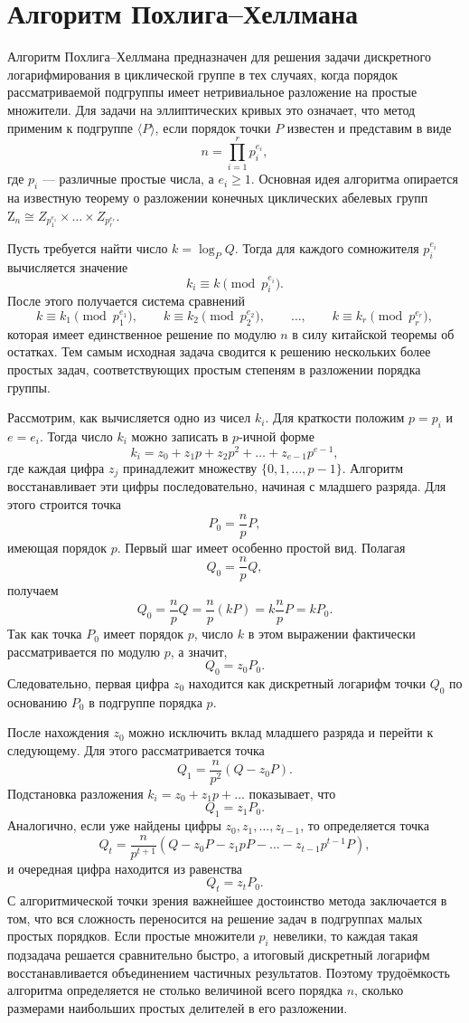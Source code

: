 \section{Алгоритм Похлига--Хеллмана}

Алгоритм Похлига--Хеллмана предназначен для решения задачи дискретного логарифмирования в циклической группе в тех случаях, когда порядок рассматриваемой подгруппы имеет нетривиальное разложение на простые множители. Для задачи на эллиптических кривых это означает, что метод применим к подгруппе $\langle P\rangle$, если порядок точки $P$ известен и представим в виде
\[
n=\prod_{i=1}^{r} p_i^{e_i},
\]
где $p_i$ --- различные простые числа, а $e_i\ge 1$. Основная идея алгоритма опирается на известную теорему о разложении конечных циклических абелевых групп $\mathrm Z_n \cong Z_{p_1^{e_1}} \times \dots \times Z_{p_r^{e_r}}$.

Пусть требуется найти число $k=\log_P Q$. Тогда для каждого сомножителя $p_i^{e_i}$ вычисляется значение
\[
k_i \equiv k \pmod {p_i^{e_i}}.
\]
После этого получается система сравнений
\[
k \equiv k_1 \pmod {p_1^{e_1}}, \qquad
k \equiv k_2 \pmod {p_2^{e_2}}, \qquad \dots, \qquad
k \equiv k_r \pmod {p_r^{e_r}},
\]
которая имеет единственное решение по модулю $n$ в силу китайской теоремы об остатках. Тем самым исходная задача сводится к решению нескольких более простых задач, соответствующих простым степеням в разложении порядка группы.

Рассмотрим, как вычисляется одно из чисел $k_i$. Для краткости положим $p=p_i$ и $e=e_i$. Тогда число $k_i$ можно записать в $p$-ичной форме
\[
k_i=z_0+z_1p+z_2p^2+\dots+z_{e-1}p^{e-1},
\]
где каждая цифра $z_j$ принадлежит множеству $\{0,1,\dots,p-1\}$. Алгоритм восстанавливает эти цифры последовательно, начиная с младшего разряда. Для этого строится точка
\[
P_0=\frac{n}{p}P,
\]
имеющая порядок $p$. Первый шаг имеет особенно простой вид. Полагая
\[
Q_0=\frac{n}{p}Q,
\]
получаем
\[
Q_0=\frac{n}{p}Q=\frac{n}{p}(kP)=k\frac{n}{p}P=kP_0.
\]
Так как точка $P_0$ имеет порядок $p$, число $k$ в этом выражении фактически рассматривается по модулю $p$, а значит,
\[
Q_0=z_0P_0.
\]
Следовательно, первая цифра $z_0$ находится как дискретный логарифм точки $Q_0$ по основанию $P_0$ в подгруппе порядка $p$.

После нахождения $z_0$ можно исключить вклад младшего разряда и перейти к следующему. Для этого рассматривается точка
\[
Q_1=\frac{n}{p^2}(Q-z_0P).
\]
Подстановка разложения $k_i=z_0+z_1p+\dots$ показывает, что
\[
Q_1=z_1P_0.
\]
Аналогично, если уже найдены цифры $z_0,z_1,\dots,z_{t-1}$, то определяется точка
\[
Q_t=\frac{n}{p^{t+1}}\left(Q-z_0P-z_1pP-\dots-z_{t-1}p^{t-1}P\right),
\]
и очередная цифра находится из равенства
\[
Q_t=z_tP_0.
\]
С алгоритмической точки зрения важнейшее достоинство метода заключается в том, что вся сложность переносится на решение задач в подгруппах малых простых порядков. Если простые множители $p_i$ невелики, то каждая такая подзадача решается сравнительно быстро, а итоговый дискретный логарифм восстанавливается объединением частичных результатов. Поэтому трудоёмкость алгоритма определяется не столько величиной всего порядка $n$, сколько размерами наибольших простых делителей в его разложении.